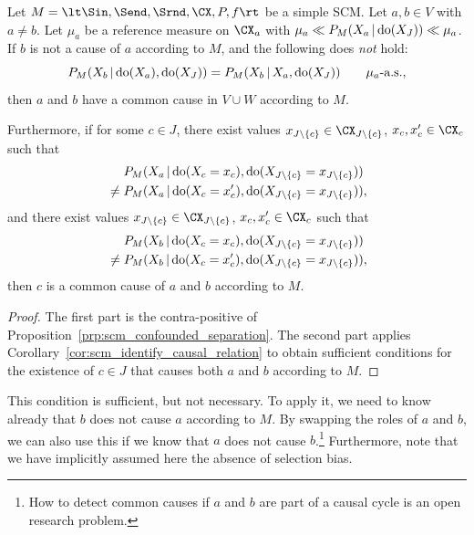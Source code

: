\begin{Cor}\label{cor:scm_identify_confounder}
Let $M = \lt \Sin, \Send, \Srnd, \CX, P, f \rt$ be a simple SCM.
Let $a, b \in V$ with $a \ne b$.
Let $\mu_a$ be a reference measure on $\CX_a$ with $\mu_a \ll P_M(X_a \operatorname*{|} \operatorname{do}(X_J)) \ll \mu_a$.
If $b$ is not a cause of $a$ according to $M$, and the following does \emph{not} hold:
  $$P_{M}(X_b \operatorname*{|} \operatorname{do}(X_a), \operatorname{do}(X_J)) = P_{M}(X_b \operatorname*{|} X_a, \operatorname{do}(X_J)) \qquad \mu_a\text{-a.s.},$$
then $a$ and $b$ have a common cause in $V \cup W$ according to $M$.

Furthermore, if for some $c \in J$, 
there exist values $x_{J\sm\{c\}} \in \CX_{J\sm\{c\}}$, $x_c,x_c' \in \CX_c$ such that
      \begin{equation*}\begin{split}
        & P_{M}(X_a \operatorname*{|} \operatorname{do}(X_c=x_c),\operatorname{do}(X_{J\setminus \{c\}}=x_{J\setminus \{c\}})) \\
        {} \ne {} & P_{M}(X_a \operatorname*{|} \operatorname{do}(X_c=x_c'),\operatorname{do}(X_{J\setminus\{c\}}=x_{J\setminus\{c\}})),
      \end{split}\end{equation*}
and there exist values $x_{J\sm\{c\}} \in \CX_{J\sm\{c\}}$, $x_c,x_c' \in \CX_c$ such that
      \begin{equation*}\begin{split}
        & P_{M}(X_b \operatorname*{|} \operatorname{do}(X_c=x_c),\operatorname{do}(X_{J\setminus \{c\}}=x_{J\setminus \{c\}})) \\
        {} \ne {} & P_{M}(X_b \operatorname*{|} \operatorname{do}(X_c=x_c'),\operatorname{do}(X_{J\setminus\{c\}}=x_{J\setminus\{c\}})),
      \end{split}\end{equation*}
then $c$ is a common cause of $a$ and $b$ according to $M$.
\end{Cor}
\begin{proof}
The first part is the contra-positive of Proposition~\ref{prp:scm_confounded_separation}.
The second part applies Corollary~\ref{cor:scm_identify_causal_relation} to obtain sufficient conditions for the existence of $c \in J$ that causes both $a$ and $b$ according to $M$.
\end{proof}  
This condition is sufficient, but not necessary.
To apply it, we need to know already that $b$ does not cause $a$ according to $M$. By
swapping the roles of $a$ and $b$, we can also use this if we know that $a$ does not cause $b$.\footnote{How to detect common causes if $a$ and $b$ are part of a causal cycle is an open research problem.}
Furthermore, note that we have implicitly assumed here the absence of selection bias.

